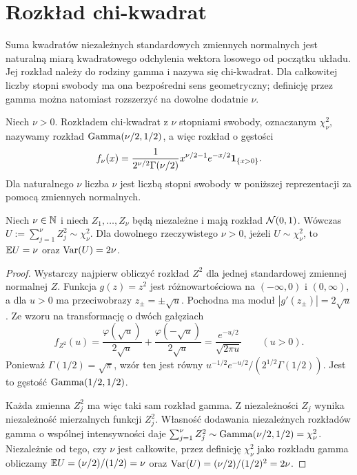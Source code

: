 \section{Rozkład chi-kwadrat}
Suma kwadratów niezależnych standardowych zmiennych normalnych
jest naturalną miarą kwadratowego odchylenia wektora losowego
od początku układu. Jej rozkład należy do rodziny gamma i
nazywa się chi-kwadrat. Dla całkowitej liczby stopni swobody
ma ona bezpośredni sens geometryczny; definicję przez gamma
można natomiast rozszerzyć na dowolne dodatnie $\nu$.

\begin{definicja}
Niech $\nu>0$. Rozkładem chi-kwadrat z $\nu$ stopniami swobody,
oznaczanym $\chi^2_\nu$, nazywamy rozkład
$\operatorname{Gamma}(\nu/2,1/2)$, a więc rozkład o gęstości
\begin{equation}\label{eq:chisq}
f_\nu(x)=\frac{1}{2^{\nu/2}\Gamma(\nu/2)}
 x^{\nu/2-1}e^{-x/2}\mathbf{1}_{\{x>0\}}.
\end{equation}
Dla naturalnego $\nu$ liczba $\nu$ jest liczbą stopni swobody
w poniższej reprezentacji za pomocą zmiennych normalnych.
\end{definicja}

\begin{twierdzenie}
Niech $\nu\in\mathbb{N}$ i niech $Z_1,\ldots,Z_\nu$ będą niezależne
i mają rozkład $\mathcal{N}(0,1)$. Wówczas
$U:=\sum_{j=1}^\nu Z_j^2\sim\chi^2_\nu$.
Dla dowolnego rzeczywistego $\nu>0$, jeżeli $U\sim\chi^2_\nu$,
to $\mathbb{E} U=\nu$ oraz $\operatorname{Var}(U)=2\nu$.
\end{twierdzenie}
\begin{proof}
Wystarczy najpierw obliczyć rozkład $Z^2$ dla jednej
standardowej zmiennej normalnej $Z$.
Funkcja $g(z)=z^2$ jest różnowartościowa na
$(-\infty,0)$ i $(0,\infty)$, a dla $u>0$ ma
przeciwobrazy $z_\pm=\pm\sqrt u$. Pochodna ma
moduł $|g'(z_\pm)|=2\sqrt u$. Ze wzoru
na transformację o dwóch gałęziach
\[
f_{Z^2}(u)=\frac{\varphi(\sqrt u)}{2\sqrt u}
+\frac{\varphi(-\sqrt u)}{2\sqrt u}
=\frac{e^{-u/2}}{\sqrt{2\pi u}}
\qquad(u>0).
\]
Ponieważ $\Gamma(1/2)=\sqrt\pi$, wzór ten jest równy
$u^{-1/2}e^{-u/2}/(2^{1/2}\Gamma(1/2))$.
Jest to gęstość $\operatorname{Gamma}(1/2,1/2)$.

Każda zmienna $Z_j^2$ ma więc taki sam rozkład gamma.
Z niezależności $Z_j$ wynika niezależność mierzalnych
funkcji $Z_j^2$. Własność dodawania niezależnych
rozkładów gamma o wspólnej intensywności daje
$\sum_{j=1}^\nu Z_j^2\sim\operatorname{Gamma}(\nu/2,1/2)=\chi^2_\nu$.
Niezależnie od tego, czy $\nu$ jest całkowite,
przez definicję $\chi^2_\nu$ jako rozkładu gamma
obliczamy $\mathbb{E} U=(\nu/2)/(1/2)=\nu$ oraz
$\operatorname{Var}(U)=(\nu/2)/(1/2)^2=2\nu$.
\end{proof}

